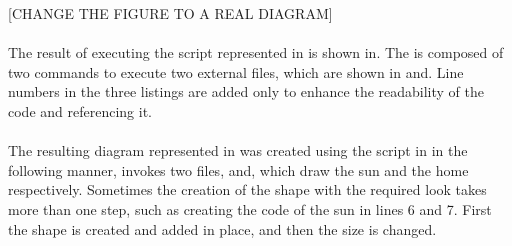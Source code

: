 [CHANGE THE FIGURE TO A REAL DIAGRAM]


\paragraph{}
The result of executing the script represented in is shown in. The is composed of two commands to execute two external files, which are shown in and. Line numbers in the three listings are added only to enhance the readability of the code and referencing it.

\paragraph{}
The resulting diagram represented in was created using the script in in the following manner, invokes two files, and, which draw the sun and the home respectively. Sometimes the creation of the shape with the required look takes more than one step, such as creating the code of the sun in lines 6 and 7. First the shape is created and added in place, and then the size is changed.


